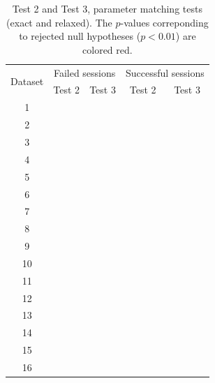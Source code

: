 \documentclass[journal,draftcls,onecolumn,12pt,twoside]{IEEEtran}
\begin{document}
\begin{table}[!t]
  \renewcommand{\arraystretch}{1.3}
  \caption{Test 2 and Test 3, parameter matching tests (exact and relaxed).
  The $p$-values correponding to rejected null hypotheses ($p < 0.01$) are
  colored red.}
  \label{tab:test23}
  \centering
  \begin{tabular}{c|c|c|c|c}
    \hline
    \multirow{2}{*}{Dataset} &  \multicolumn{2}{c|}{Failed sessions} &
    \multicolumn{2}{c}{Successful sessions} \\
    \cline{2-5}
    & Test 2 & Test 3 & Test 2 & Test 3 \\
    \hline
    1 & & & & \\
    2 & & & & \\
    3 & & & & \\
    4 & & & & \\
    \hline
    5 & & & & \\
    6 & & & & \\
    7 & & & & \\
    8 & & & & \\
    \hline
    9 & & & & \\
    10 & & & & \\
    11 & & & & \\
    12 & & & & \\
    \hline
    13 & & & & \\
    14 & & & & \\
    15 & & & & \\
    16 & & & & \\
    \hline
  \end{tabular}
\end{table}
\end{document}
